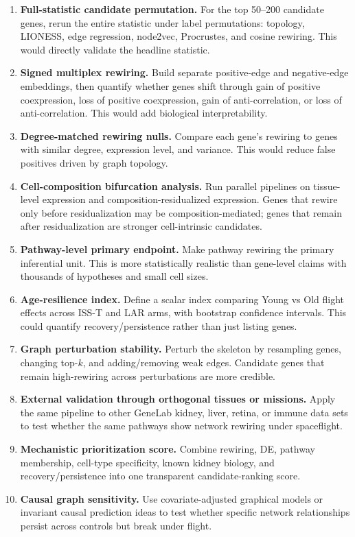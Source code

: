 \documentclass[11pt]{article}
\begin{document}
\begin{enumerate}[leftmargin=1.5em]
    \item \textbf{Full-statistic candidate permutation.}  For the top 50--200 candidate genes, rerun the entire statistic under label permutations: topology, LIONESS, edge regression, node2vec, Procrustes, and cosine rewiring.  This would directly validate the headline statistic.

    \item \textbf{Signed multiplex rewiring.}  Build separate positive-edge and negative-edge embeddings, then quantify whether genes shift through gain of positive coexpression, loss of positive coexpression, gain of anti-correlation, or loss of anti-correlation.  This would add biological interpretability.

    \item \textbf{Degree-matched rewiring nulls.}  Compare each gene's rewiring to genes with similar degree, expression level, and variance.  This would reduce false positives driven by graph topology.

    \item \textbf{Cell-composition bifurcation analysis.}  Run parallel pipelines on tissue-level expression and composition-residualized expression.  Genes that rewire only before residualization may be composition-mediated; genes that remain after residualization are stronger cell-intrinsic candidates.

    \item \textbf{Pathway-level primary endpoint.}  Make pathway rewiring the primary inferential unit.  This is more statistically realistic than gene-level claims with thousands of hypotheses and small cell sizes.

    \item \textbf{Age-resilience index.}  Define a scalar index comparing Young vs Old flight effects across ISS-T and LAR arms, with bootstrap confidence intervals.  This could quantify recovery/persistence rather than just listing genes.

    \item \textbf{Graph perturbation stability.}  Perturb the skeleton by resampling genes, changing top-$k$, and adding/removing weak edges.  Candidate genes that remain high-rewiring across perturbations are more credible.

    \item \textbf{External validation through orthogonal tissues or missions.}  Apply the same pipeline to other GeneLab kidney, liver, retina, or immune data sets to test whether the same pathways show network rewiring under spaceflight.

    \item \textbf{Mechanistic prioritization score.}  Combine rewiring, DE, pathway membership, cell-type specificity, known kidney biology, and recovery/persistence into one transparent candidate-ranking score.

    \item \textbf{Causal graph sensitivity.}  Use covariate-adjusted graphical models or invariant causal prediction ideas to test whether specific network relationships persist across controls but break under flight.
\end{enumerate}
\end{document}

